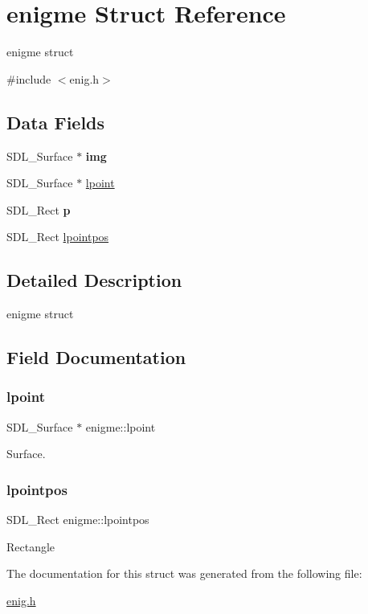 \hypertarget{structenigme}{}\section{enigme Struct Reference}
\label{structenigme}


enigme struct  




{\ttfamily \#include $<$enig.\+h$>$}

\subsection*{Data Fields}
\begin{DoxyCompactItemize}
\item 
\mbox{\label{structenigme_ac5c2141e5f8c366ff16d1fad83ee3e54}} 
S\+D\+L\+\_\+\+Surface $\ast$ {\bfseries img}
\item 
S\+D\+L\+\_\+\+Surface $\ast$ \hyperlink{structenigme_ad15bfe1f4b842b8694dd64dc29c65d8d}{lpoint}
\item 
\mbox{\label{structenigme_a1ecc3fa572d2c308e1aecacf74fd1ec0}} 
S\+D\+L\+\_\+\+Rect {\bfseries p}
\item 
S\+D\+L\+\_\+\+Rect \hyperlink{structenigme_a67e3facd55ae7707e4e339a1bbeee064}{lpointpos}
\end{DoxyCompactItemize}


\subsection{Detailed Description}
enigme struct 

\subsection{Field Documentation}
\mbox{\label{structenigme_ad15bfe1f4b842b8694dd64dc29c65d8d}} 
\subsubsection{\texorpdfstring{lpoint}{lpoint}}
{\footnotesize\ttfamily S\+D\+L\+\_\+\+Surface $\ast$ enigme\+::lpoint}

Surface. \mbox{\label{structenigme_a67e3facd55ae7707e4e339a1bbeee064}} 
\subsubsection{\texorpdfstring{lpointpos}{lpointpos}}
{\footnotesize\ttfamily S\+D\+L\+\_\+\+Rect enigme\+::lpointpos}

Rectangle 

The documentation for this struct was generated from the following file\+:\begin{DoxyCompactItemize}
\item 
\hyperlink{enig_8h}{enig.\+h}\end{DoxyCompactItemize}
